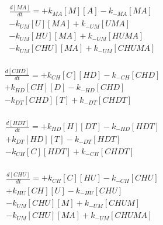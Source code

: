 \begin{equation}
\begin{split}
\frac{d[MA]}{dt} =    + k_{MA}[M][A]    - k_{-MA}[MA]     \\%
                      - k_{UM}[U][MA]   + k_{-UM}[UMA]    \\%
                      - k_{UM}[HU][MA]  + k_{-UM}[HUMA]   \\%
                      - k_{UM}[CHU][MA] + k_{-UM}[CHUMA]  \\%
\end{split}
\end{equation}

\begin{equation}
\begin{split}
\frac{d[CHD]}{dt} =   + k_{CH}[C][HD]  - k_{-CH}[CHD]     \\%
                      + k_{HD}[CH][D]  - k_{-HD}[CHD]     \\%
                      - k_{DT}[CHD][T] + k_{-DT}[CHDT]    \\%
\end{split}
\end{equation}


\begin{equation}
\begin{split}
\frac{d[HDT]}{dt} =   + k_{HD}[H][DT]  - k_{-HD}[HDT]     \\%
                      + k_{DT}[HD][T]  - k_{-DT}[HDT]     \\%
                      - k_{CH}[C][HDT] + k_{-CH}[CHDT]    \\%
\end{split}
\end{equation}

\begin{equation}
\begin{split}
\frac{d[CHU]}{dt} =   + k_{CH}[C][HU]   - k_{-CH}[CHU]    \\%
                      + k_{HU}[CH][U]   - k_{-HU}[CHU]    \\%
                      - k_{UM}[CHU][M]  + k_{-UM}[CHUM]   \\%
                      - k_{UM}[CHU][MA] + k_{-UM}[CHUMA]  \\%
\end{split}
\end{equation}


